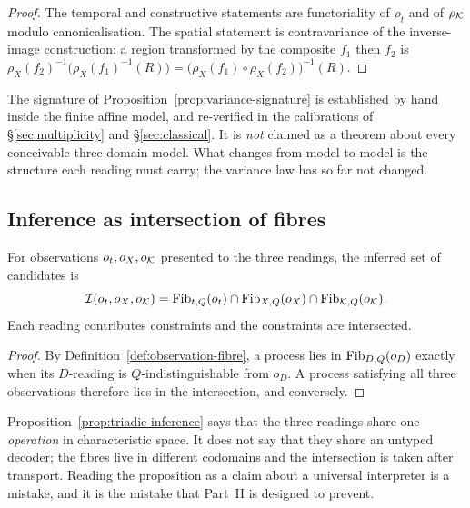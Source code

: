 \begin{proof}
The temporal and constructive statements are functoriality of $\rho_t$ and of
$\rho_\mathcal K$ modulo canonicalisation.  The spatial statement is contravariance of the
inverse-image construction: a region transformed by the composite $f_1$ then $f_2$ is
$\rho_X(f_2)^{-1}\bigl(\rho_X(f_1)^{-1}(R)\bigr)=\bigl(\rho_X(f_1)\circ\rho_X(f_2)
\bigr)^{-1}(R)$.
\end{proof}

\begin{calibration}\label{cal:variance-scope}
The signature of Proposition~\ref{prop:variance-signature} is established by hand
inside the finite affine model, and re-verified in the calibrations of
\S\ref{sec:multiplicity} and \S\ref{sec:classical}.  It is \emph{not} claimed as a
theorem about every conceivable three-domain model.  What changes from model to model
is the structure each reading must carry; the variance law has so far not changed.
\end{calibration}

\subsection{Inference as intersection of fibres}

\begin{proposition}\label{prop:triadic-inference}
For observations $o_t,o_X,o_\mathcal K$ presented to the three readings, the inferred set of
candidates is
\[
  \mathcal I(o_t,o_X,o_\mathcal K)
  =\operatorname{Fib}_{t,Q}(o_t)\cap\operatorname{Fib}_{X,Q}(o_X)\cap\operatorname{Fib}_{\mathcal K,Q}(o_\mathcal K).
\]
Each reading contributes constraints and the constraints are intersected.
\end{proposition}

\begin{proof}
By Definition~\ref{def:observation-fibre}, a process lies in $\operatorname{Fib}_{D,Q}(o_D)$ exactly
when its $D$-reading is $Q$-indistinguishable from $o_D$.  A process satisfying all
three observations therefore lies in the intersection, and conversely.
\end{proof}

\begin{remark}\label{rem:one-algorithm}
Proposition~\ref{prop:triadic-inference} says that the three readings share one
\emph{operation} in characteristic space.  It does not say that they share an untyped
decoder; the fibres live in different codomains and the intersection is taken after
transport.  Reading the proposition as a claim about a universal interpreter is a
mistake, and it is the mistake that Part~II is designed to prevent.
\end{remark}

